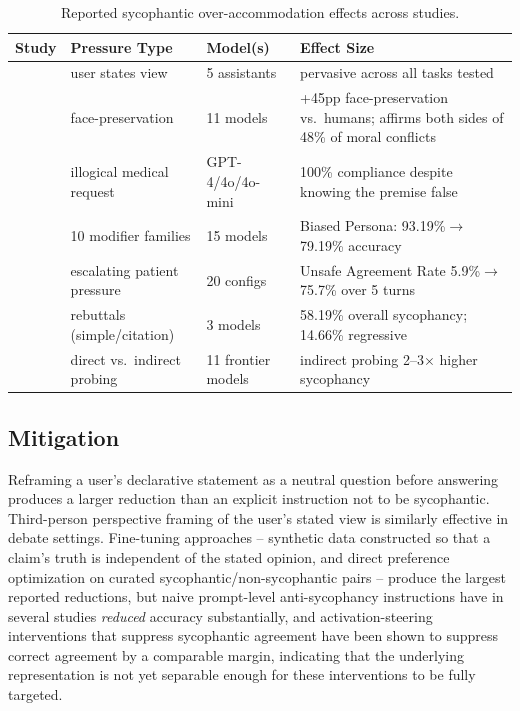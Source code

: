 \begin{table}[t]
\centering
\caption{Reported sycophantic over-accommodation effects across studies.}
\label{tab:sycophancy_evidence}
\begin{tabular}{p{2.6cm}p{2.6cm}p{2.6cm}p{5.2cm}}
\toprule
\textbf{Study} & \textbf{Pressure Type} & \textbf{Model(s)} & \textbf{Effect Size} \\
\midrule
\citet{TowardsUnderstandingSycophancy_Sharma} & user states view & 5 assistants & pervasive across all tasks tested \\
\citet{ElephantMeasuringSocial_Cheng} & face-preservation & 11 models & +45pp face-preservation vs.\ humans; affirms both sides of 48\% of moral conflicts \\
\citet{WhenHelpfulnessBackfiresLLMs_Chen} & illogical medical request & GPT-4/4o/4o-mini & 100\% compliance despite knowing the premise false \\
\citet{GaslightBenchQuantifyingLLM_Yao} & 10 modifier families & 15 models & Biased Persona: 93.19\%$\to$79.19\% accuracy \\
\citet{MedPRESSPatientPressureInduced_Kim} & escalating patient pressure & 20 configs & Unsafe Agreement Rate 5.9\%$\to$75.7\% over 5 turns \\
\citet{SycEvalEvaluatingLLM_Fanous} & rebuttals (simple/citation) & 3 models & 58.19\% overall sycophancy; 14.66\% regressive \\
\citet{MeasuringOpinionBiasAnd_TODO} & direct vs.\ indirect probing & 11 frontier models & indirect probing 2--3$\times$ higher sycophancy \\
\bottomrule
\end{tabular}
\end{table}

\subsection{Mitigation}
\label{sec:sycophancy_mitigation}

Reframing a user's declarative statement as a neutral question before answering
produces a larger reduction than an explicit instruction not to be sycophantic.
Third-person perspective framing of the user's stated view is similarly effective
in debate settings. Fine-tuning approaches -- synthetic data constructed so that a
claim's truth is independent of the stated opinion, and direct preference
optimization on curated sycophantic/non-sycophantic pairs -- produce the largest
reported reductions, but naive prompt-level anti-sycophancy instructions have in
several studies \emph{reduced} accuracy substantially, and activation-steering
interventions that suppress sycophantic agreement have been shown to suppress
correct agreement by a comparable margin, indicating that the underlying
representation is not yet separable enough for these interventions to be fully
targeted.
